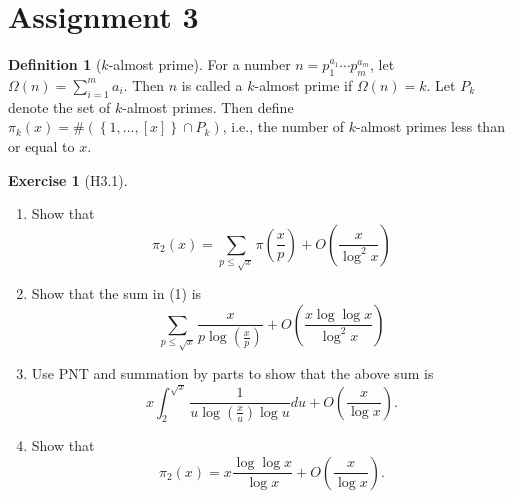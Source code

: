 \documentclass[reqno]{amsart}
\theoremstyle{definition}
\newtheorem{definition}[theorem]{Definition}
\newtheorem{exercise}[theorem]{Exercise}
\theoremstyle{remark}
\begin{document}
\section{Assignment 3}

\begin{definition}[$k$-almost prime]
    For a number
    $n = p_1^{a_1} \cdots
    p_m^{a_m}$, let
    $\Omega (n) = \sum_{i=1}^{m} a_i$.
    Then $n$ is called a
    $k$-almost prime if
    $\Omega (n) = k$.
    Let $P_k$ denote the
    set of $k$-almost primes.
    Then define
    $\pi_k(x) = 
    \# \left( \left\{ 1, \ldots, \left[ x \right]  \right\} 
    \cap P_k \right)$, i.e., the
    number of $k$-almost primes
    less than or equal to $x$.
\end{definition}

\begin{exercise}[H3.1]
    \begin{enumerate}
        \item Show that
            \[
            \pi_2(x) = 
            \sum_{p \le \sqrt{x} }
            \pi\left( \frac{x}{p} \right) +
            O\left( \frac{x}{\log^2 x} \right) 
            \] 
        \item Show that the sum in (1) is
            \[
            \sum_{p\le \sqrt{x} }
            \frac{x}{p \log \left( \frac{x}{p} \right) }
            + O \left( \frac{x \log \log x}{\log^2 x} \right) 
            \] 
        \item Use PNT and summation by parts to show
            that the above sum is
            \[
            x \int_{2}^{\sqrt{x} } 
            \frac{1}{u \log \left( \frac{x}{u} \right) 
            \log u} du +
            O \left( \frac{x}{\log x} \right) .
            \] 
        \item Show that
             \[
            \pi_2 (x) =
            x \frac{\log \log x}{\log x}
            + O \left( \frac{x}{\log x} \right) .
            \] 
    \end{enumerate}
\end{exercise}
\end{document}
